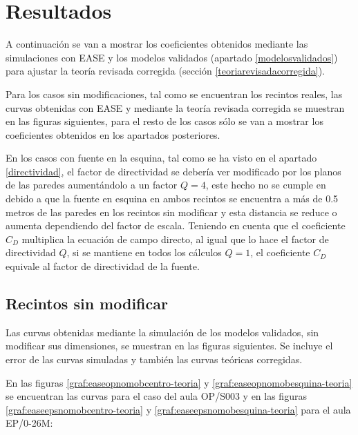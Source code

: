 
\chapter{Resultados}
\label{resultados}

A continuación se van a mostrar los coeficientes obtenidos mediante las simulaciones con EASE y los modelos validados (apartado \ref{modelosvalidados})  para ajustar la teoría revisada corregida (sección \ref{teoriarevisadacorregida}).

Para los casos sin modificaciones, tal como se encuentran los recintos reales, las curvas obtenidas con EASE y mediante la teoría revisada corregida se muestran en las figuras siguientes, para el resto de los casos sólo se van a mostrar los coeficientes obtenidos en los apartados posteriores.

En los casos con fuente en la esquina, tal como se ha visto en el apartado \ref{directividad}, el factor de directividad se debería ver modificado por los planos de las paredes aumentándolo a un factor $Q=4$, este hecho no se cumple en debido a que la fuente en esquina en ambos recintos se encuentra a más de 0.5 metros de las paredes en los recintos sin modificar y esta distancia se reduce o aumenta dependiendo del factor de escala.
Teniendo en cuenta que el coeficiente $C_D$ multiplica la ecuación de campo directo, al igual que lo hace el factor de directividad $Q$, si se mantiene en todos los cálculos $Q=1$, el coeficiente $C_D$ equivale al factor de directividad de la fuente.

\section{Recintos sin modificar}


Las curvas obtenidas mediante la simulación de los modelos validados, sin modificar sus dimensiones, se muestran en las figuras siguientes. Se incluye el error de las curvas simuladas y también las curvas teóricas corregidas.
\\
\par
En las figuras \ref{graf:easeopnomobcentro-teoria} y \ref{graf:easeopnomobesquina-teoria} se encuentran las curvas para el caso del aula OP/S003 y en las figuras \ref{graf:easeepsnomobcentro-teoria} y \ref{graf:easeepsnomobesquina-teoria} para el aula EP/0-26M:

